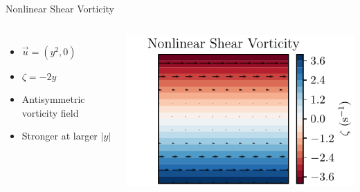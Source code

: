     \begin{frame}{Nonlinear Shear Vorticity}
    \begin{columns}
      \begin{itemize}
        \item \( \vec{u} = (y^2, 0) \)
        \item \( \zeta = -2y \)
        \item Antisymmetric vorticity field
        \item Stronger at larger \( |y| \)
      \end{itemize}
    
      \includegraphics[width=\linewidth]{../images/vorticity_plot2.pdf}
    \end{columns}
    \end{frame}
    
